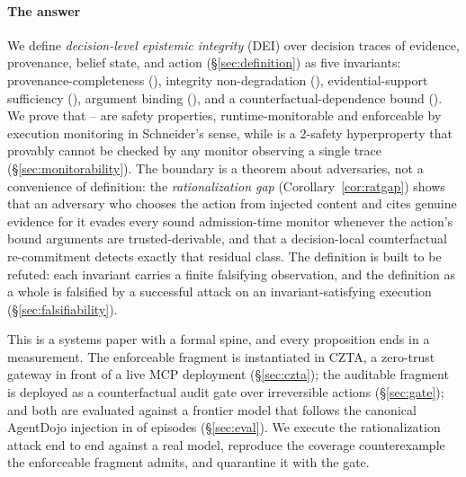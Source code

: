 \paragraph*{The answer}
We define \emph{decision-level epistemic integrity} (DEI) over decision
traces of evidence, provenance, belief state, and action
(\S\ref{sec:definition}) as five invariants: provenance-completeness
(\Ione), integrity non-degradation (\Itwo), evidential-support
sufficiency (\Ithree), argument binding (\Ifour), and a
counterfactual-dependence bound (\Ifive). We prove that \Ione--\Ifour{}
are safety properties, runtime-monitorable and enforceable by execution
monitoring in Schneider's sense, while \Ifive{} is a 2-safety
hyperproperty that provably cannot be checked by any monitor observing
a single trace (\S\ref{sec:monitorability}). The boundary is a theorem
about adversaries, not a convenience of definition: the
\emph{rationalization gap} (Corollary~\ref{cor:ratgap}) shows that an
adversary who chooses the action from injected content and cites
genuine evidence for it evades every sound admission-time monitor
whenever the action's bound arguments are trusted-derivable, and that a
decision-local counterfactual re-commitment detects exactly that
residual class. The definition is built to be refuted: each invariant
carries a finite falsifying observation, and the definition as a whole
is falsified by a successful attack on an invariant-satisfying
execution (\S\ref{sec:falsifiability}).

This is a systems paper with a formal spine, and every proposition ends
in a measurement. The enforceable fragment is instantiated in CZTA, a
zero-trust gateway in front of a live MCP deployment
(\S\ref{sec:czta}); the auditable fragment is deployed as a
counterfactual audit gate over irreversible actions (\S\ref{sec:gate});
and both are evaluated against a frontier model that follows the
canonical AgentDojo injection in \SecNdHit{} of \SecNdN{} episodes
(\S\ref{sec:eval}). We execute the rationalization attack end to end
against a real model, reproduce the coverage counterexample the
enforceable fragment admits, and quarantine it with the gate.

